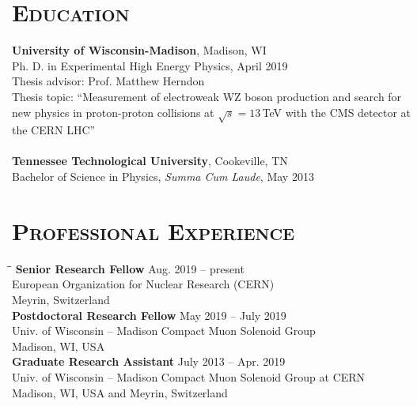 \documentclass[10pt]{res} %
\begin{document}

\address{{\bf Current Address} \\  Bat. 32/4-B03 CERN \\  Geneva 23, \\ Switzerland}
\address{{\bf Permanent Address} \\ 5710 Lake Mendota Dr. \\ Madison, WI, 53705
\\ +41 77 501 95 13}

\begin{resume}

\section{\textsc{Education}}
  \textbf{University of Wisconsin-Madison}, Madison, WI \\
Ph. D. in Experimental High Energy Physics, April 2019 \\
  Thesis advisor: Prof. Matthew Herndon \\
  Thesis topic: ``Measurement of electroweak WZ boson production and search for new physics in proton-proton collisions at $\sqrt{s}=13$\,TeV with the CMS detector at the CERN LHC'' \\
\\
  \textbf{Tennessee Technological University}, Cookeville, TN \\
Bachelor of Science in Physics, \textit{Summa Cum Laude}, May 2013 \\

\section{\textsc{Professional Experience}}
\vspace{-0.1in}
\begin{tabbing}
\hspace{2.3in}\= \hspace{2.5in}\= \kill %
{\bf Senior Research Fellow} \>\> Aug. 2019 -- present \\
European Organization for Nuclear Research (CERN)   \\  Meyrin, Switzerland \\
{\bf Postdoctoral Research Fellow} \>\> May 2019 -- July 2019\\
Univ. of Wisconsin -- Madison Compact Muon Solenoid Group \\  Madison, WI, USA \\
{\bf Graduate Research Assistant} \>\> July 2013 -- Apr. 2019\\
Univ. of Wisconsin -- Madison Compact Muon Solenoid Group at CERN   \\  Madison, WI, USA and Meyrin, Switzerland \\
\end{tabbing}\vspace{-20pt}      %


\end{resume}
\end{document}
